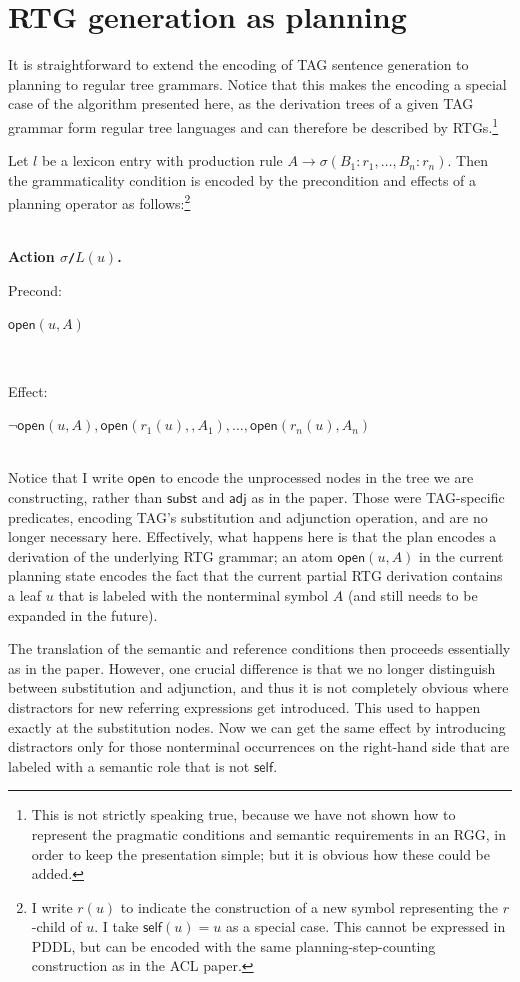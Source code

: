 \documentclass[11pt,a4]{article}
\newcommand{\self}{\mathsf{self}}
\newcommand{\Neq}{{:}}
\theoremstyle{plain}
\theoremstyle{definition}
\newcommand{\action}[4]{\textbf{Action \texttt{#1}$(#2)$.}\\
\strut\quad   Precond:$\;$ \parbox[t]{12cm}{\ensuremath{#3}}\\
\strut\quad   Effect:$\;$ \parbox[t]{12cm}{\ensuremath{#4}}}
\newcommand{\open}{\ensuremath{\mathsf{open}}}
\begin{document}
\section{RTG generation as planning} 
\label{sec:rtg-generation-as-planning}

It is straightforward to extend the encoding of TAG sentence
generation to planning \citep{KolSto07} to regular tree grammars.
Notice that this makes the \citet{KolSto07} encoding a special case of
the algorithm presented here, as the derivation trees of a given TAG
grammar form regular tree languages
\citep{schmitz08:_featur_in_tag_deriv_trees} and can therefore be
described by RTGs.\footnote{This is not strictly speaking true,
  because we have not shown how to represent the pragmatic conditions
  and semantic requirements in an RGG, in order to keep the
  presentation simple; but it is obvious how these could be added.}

Let $l$ be a lexicon entry with production rule $A \rightarrow
\sigma(B_1 \Neq r_1, \ldots, B_n \Neq r_n)$.  Then the grammaticality
condition is encoded by the precondition and effects of a planning
operator as follows:\footnote{I write $r(u)$ to indicate the
  construction of a new symbol representing the $r$-child of $u$. I
  take $\self(u) = u$ as a special case. This cannot be expressed in
  PDDL, but can be encoded with the same planning-step-counting
  construction as in the ACL paper.}

\strut\\
\action{$\sigma$/$L$}{u}
{\open(u,A)}
{\neg \open(u,A), \open(r_1(u),,A_1), \ldots, \open(r_n(u),A_n)}\\

Notice that I write $\open$ to encode the unprocessed nodes in the
tree we are constructing, rather than $\mathsf{subst}$ and
$\mathsf{adj}$ as in the paper. Those were TAG-specific predicates,
encoding TAG's substitution and adjunction operation, and are no
longer necessary here. Effectively, what happens here is that the plan
encodes a derivation of the underlying RTG grammar; an atom
$\open(u,A)$ in the current planning state encodes the fact that the
current partial RTG derivation contains a leaf $u$ that is labeled
with the nonterminal symbol $A$ (and still needs to be expanded in the
future).

The translation of the semantic and reference conditions then proceeds
essentially as in the paper.  However, one crucial difference is that
we no longer distinguish between substitution and adjunction, and thus
it is not completely obvious where distractors for new referring
expressions get introduced. This used to happen exactly at the
substitution nodes. Now we can get the same effect by introducing
distractors only for those nonterminal occurrences on the right-hand
side that are labeled with a semantic role that is not $\self$.
\end{document}
